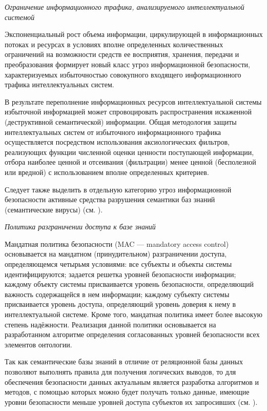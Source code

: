 \textit{Ограничение информационного трафика, анализируемого интеллектуальной системой}

Экспоненциальный рост объема информации, циркулирующей в информационных потоках и ресурсах в условиях вполне определенных количественных ограничений на возможности средств ее восприятия, хранения, передачи и преобразования формирует новый класс угроз информационной безопасности, характеризуемых избыточностью совокупного входящего информационного трафика интеллектуальных систем.

В результате переполнение информационных ресурсов интеллектуальной системы избыточной информацией может спровоцировать распространения искаженной (деструктивной семантической) информации. Общая методология защиты интеллектуальных систем от избыточного информационного трафика осуществляется посредством использования аксиологических фильтров, реализующих функции численной оценки ценности поступающей информации, отбора наиболее ценной и отсеивания (фильтрации) менее ценной (бесполезной или вредной) с использованием вполне определенных критериев.

Следует также выделить в отдельную категорию угроз информационной безопасности активные средства разрушения семантики баз знаний (семантические вирусы) (см. ).

\textit{Политика разграничении доступа к базе знаний}

Мандатная политика безопасности (MAC --- mandatory access control) основывается на мандатном (принудительном) разграничении доступа, определяющемся четырьмя условиями: все субъекты и объекты системы идентифицируются; задается решетка уровней безопасности информации; каждому объекту системы присваивается уровень безопасности, определяющий важность содержащейся в нем информации; каждому субъекту системы присваивается уровень доступа, определяющий уровень доверия к нему в интеллектуальной системе. Кроме того, мандатная политика имеет более высокую степень надёжности. Реализация данной политики основывается на разработанном алгоритме определения согласованных уровней безопасности всех элементов онтологии.

Так как семантические базы знаний в отличие от реляционной базы данных позволяют выполнять правила для получения логических выводов, то для обеспечения безопасности данных актуальным является разработка алгоритмов и методов, с помощью которых можно будет получать только данные, имеющие уровни безопасности меньше уровней доступа субъектов их запросивших (см. ).

